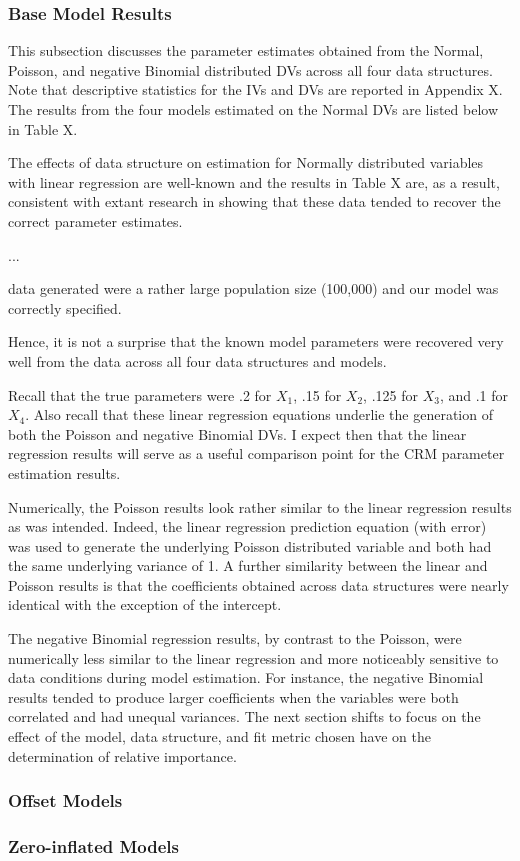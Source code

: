 \documentclass[ShortAfour,times,sageapa]{sagej}
\begin{document}
\subsubsection{Base Model Results}

This subsection discusses the parameter estimates obtained from the Normal, Poisson, and negative Binomial distributed DVs across all four data structures.  
Note that descriptive statistics for the IVs and DVs are reported in Appendix X.  The results from the four models estimated on the Normal DVs are listed below in Table X.



The effects of data structure on estimation for Normally distributed variables with linear regression are well-known and the results in Table X are, as a result, consistent with extant research in showing that these data tended to recover the correct parameter estimates.

...

data generated were a rather large population size (100,000) and our model was correctly specified.  

Hence, it is not a surprise that the known model parameters were recovered very well from the data across all four data structures and models.

Recall that the true parameters were .2 for $X_1$, .15 for $X_2$, .125 for $X_3$, and .1 for $X_4$.  
Also recall that these linear regression equations underlie the generation of both the Poisson and negative Binomial DVs.  
I expect then that the linear regression results will serve as a useful comparison point for the CRM parameter estimation results.



Numerically, the Poisson results look rather similar to the linear regression results as was intended.  
Indeed, the linear regression prediction equation (with error) was used to generate the underlying Poisson distributed variable and both had the same underlying variance of 1.
A further similarity between the linear and Poisson results is that the coefficients obtained across data structures were nearly identical with the exception of the intercept.



The negative Binomial regression results, by contrast to the Poisson, were numerically less similar to the linear regression and more noticeably sensitive to data conditions during model estimation.
For instance, the negative Binomial results tended to produce larger coefficients when the variables were both correlated and had unequal variances.
The next section shifts to focus on the effect of the model, data structure, and fit metric chosen have on the determination of relative importance.

\subsubsection{Offset Models}

\subsubsection{Zero-inflated Models}




	
\end{document}
